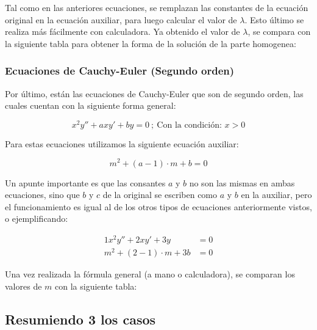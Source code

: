 Tal como en las anteriores ecuaciones, se remplazan las constantes de la ecuación original en la ecuación auxiliar, para luego calcular el valor de $\lambda$. Esto último se realiza más fácilmente con calculadora.
Ya obtenido el valor de $\lambda$, se compara con la siguiente tabla para obtener la forma de la solución de la parte homogenea:

    

\subsubsection{Ecuaciones de Cauchy-Euler (Segundo orden)}

Por último, están las ecuaciones de Cauchy-Euler que son de segundo orden, las cuales cuentan con la siguiente forma general:

\begin{equation}\label{eq:forma_cauchy}
    x^{2}y'' + axy' + by = 0 \ ; \ \text{Con la condición: } x > 0
\end{equation}

Para estas ecuaciones utilizamos la siguiente ecuación auxiliar:

\begin{equation}\label{eq:aux_cauchy}
    m^{2} + (a-1) \cdot m + b = 0
\end{equation}

Un apunte importante es que las consantes $a$ y $b$ no son las mismas en ambas ecuaciones, sino que $b$ y $c$ de la original se escriben como $a$ y $b$ en la auxiliar, pero el funcionamiento es igual al de los otros tipos de ecuaciones anteriormente vistos, o ejemplificando:

\begin{align*}
    1x^{2}y'' + 2xy' + 3y &= 0
    \\
    m^{2} + (2-1) \cdot m + 3b &= 0
\end{align*}

Una vez realizada la fórmula general (a mano o calculadora), se comparan los valores de $m$ con la siguiente tabla:

    

\subsection{Resumiendo 3 los casos}

